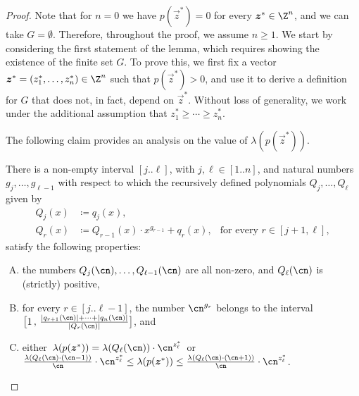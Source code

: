 \begin{proof}
    Note that for $n = 0$ we have $p(\vec z^*) = 0$ for every $\vec z^* \in \Z^n$, and we can take $G = \emptyset$. Therefore, throughout the proof, we assume $n \geq 1$.
    We start by considering the first statement of the lemma, which requires showing the existence of the finite set $G$. 
    To prove this, we first fix a vector $\vec z^* = (z_1^*,\dots,z_n^*) \in \Z^n$ such that $p(\vec z^*) > 0$, 
    and use it to derive a definition for $G$ that does not, in fact, depend on $\vec z^*$.
    Without loss of generality, we work under the additional assumption that
    $z_1^* \geq \cdots \geq z_n^*$.

    The following claim provides an analysis on the value of $\lambda(p(\vec z^*))$.
  
    \begin{claim}\label{claim1:lambda-close-to-variable}
      There is a non-empty interval $[j..\ell]$, with $j,\ell \in [1..n]$,
      and natural numbers ${g_j},\dots,{g_{\ell-1}}$
      with respect to which the recursively defined polynomials
      $Q_j,\dots,Q_{\ell}$ given by
      \begin{align*}
        Q_j(x) & \coloneqq q_j(x),                                  \\
        Q_r(x) & \coloneqq Q_{r-1}(x) \cdot x^{g_{r-1}} + q_{r}(x),
               & \text{for every } r \in [j+1,\ell],
      \end{align*}
      satisfy the following properties:
      \begin{enumerate}[A.]
        \item\label{claim1:lambda-close-to-variable:A}
        the numbers $Q_j(\cn),\dots,Q_{\ell-1}(\cn)$ are all non-zero, and
        $Q_\ell(\cn)$ is (strictly) positive,
        \item\label{claim1:lambda-close-to-variable:B}
        for every $r \in [j..\ell-1]$,
        the number $\cn^{g_r}$ belongs to the interval
        $\big[1\,,\,\frac{\abs{q_{r+1}(\cn)}+\cdots+\abs{q_n(\cn)}}{\abs{Q_r(\cn)}}\big]$,
        and
        \item\label{claim1:lambda-close-to-variable:C}
        either\, $\lambda(p(\vec z^*)) = \lambda(Q_\ell(\cn)) \cdot
          \cn^{z_\ell^*}$\, or\, $\frac{\lambda(Q_\ell(\cn) \cdot (\cn-1))}{\cn} \cdot
          \cn^{z_\ell^*} \leq \lambda(p(\vec z^*)) \leq
          \frac{\lambda(Q_\ell(\cn) \cdot (\cn+1))}{\cn} \cdot \cn^{z_\ell^*}$.
      \end{enumerate}
    \end{claim}
  

\end{proof}

